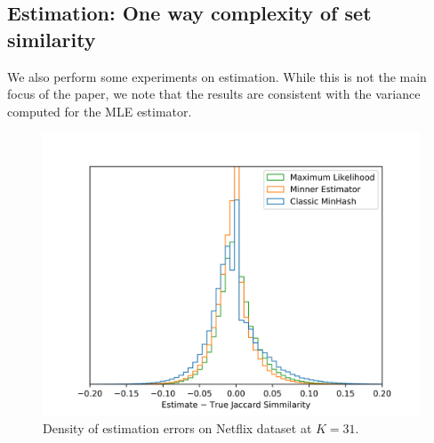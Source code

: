 \subsection{Estimation: One way complexity of set similarity}

We also perform some experiments on estimation.
While this is not the main focus of the paper, we note that the results are consistent with the variance computed for the MLE estimator.

\begin{figure}[h]
   \centering
   \includegraphics[trim=0 5 35 40,clip,width=\linewidth]{figures/hist2}
\caption{Density of estimation errors on Netflix dataset at $K=31$.
}
\end{figure}

